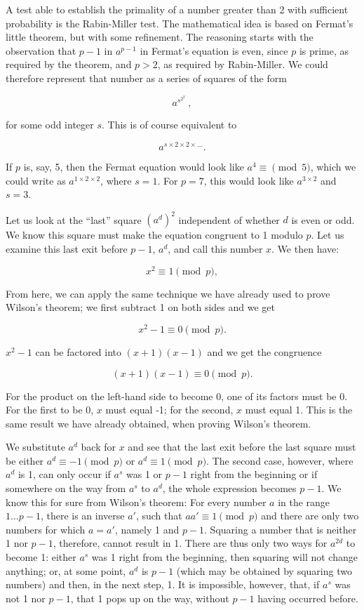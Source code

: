 \documentclass{scrreprt}
\begin{document}
A test able to establish the primality of a number
greater than 2
with sufficient probability is the Rabin-Miller test.
The mathematical idea is based on Fermat's little theorem,
but with some refinement.
The reasoning starts with the observation
that $p-1$ in $a^{p-1}$ in Fermat's equation is even, 
since $p$ is prime, 
as required by the theorem, and $p > 2$,
as required by Rabin-Miller.
We could therefore represent that number as a series
of squares of the form

\[
a^{s^{2^{2^{...}}}}, 
\]

for some odd integer $s$.
This is of course equivalent to

\[
a^{s \times 2 \times 2 \times \dots}.
\]

If $p$ is, say, 5, then the Fermat equation
would look like $a^4 \equiv \pmod{5}$,
which we could write as $a^{1 \times 2\times 2}$,
where $s=1$.
For $p = 7$, this would look like $a^{3\times 2}$
and $s = 3$.

Let us look at the ``last'' square
$(a^d)^2$ independent of whether $d$ is even or odd.
We know this square must make the equation congruent
to 1 modulo $p$. Let us examine this last exit before $p-1$,
$a^d$, and call this number $x$.
We then have:

\[
x^2 \equiv 1 \pmod{p},
\]

From here, we can apply the same technique
we have already used to prove Wilson's theorem;
we first subtract 1 on both sides and we get

\[
x^2 - 1 \equiv 0 \pmod{p}.
\]

$x^2 - 1$ can be factored into
$(x+1)(x-1)$ and we get the congruence

\[
(x + 1)(x - 1) \equiv 0 \pmod{p}.
\]

For the product on the left-hand side to become 0,
one of its factors must be 0. For the first to be 0,
$x$ must equal -1; for the second, $x$ must equal 1.
This is the same result we have already obtained,
when proving Wilson's theorem.

We substitute $a^d$ back for $x$ and see 
that the last exit before the last square
must be either 
$a^d \equiv -1 \pmod{p}$ or 
$a^d \equiv  1 \pmod{p}$.
The second case, however, where $a^d$ is 1,
can only occur if $a^s$ was 1 or $p-1$ right from the beginning
or if somewhere on the way from $a^s$ to $a^d$,
the whole expression becomes $p-1$.
We know this for sure from Wilson's theorem:
For every number $a$ in the range $1\dots p-1$,
there is an inverse $a'$, such that $aa' \equiv 1 \pmod{p}$
and there are only two numbers for which $a = a'$,
namely 1 and $p-1$.
Squaring a number that is neither 1 nor $p-1$, therefore,
cannot result in 1.
There are thus only two ways for $a^{2d}$ to become 1:
either $a^s$ was 1 right from the beginning,
then squaring will not change anything;
or, at some point, 
$a^d$ is $p-1$ (which may be obtained by squaring two numbers) and then,
in the next step, 1.
It is impossible, however, 
that, if $a^s$ was not 1 nor $p-1$,
that 1 pops up on the way, without $p-1$ having occurred before.
\end{document}
